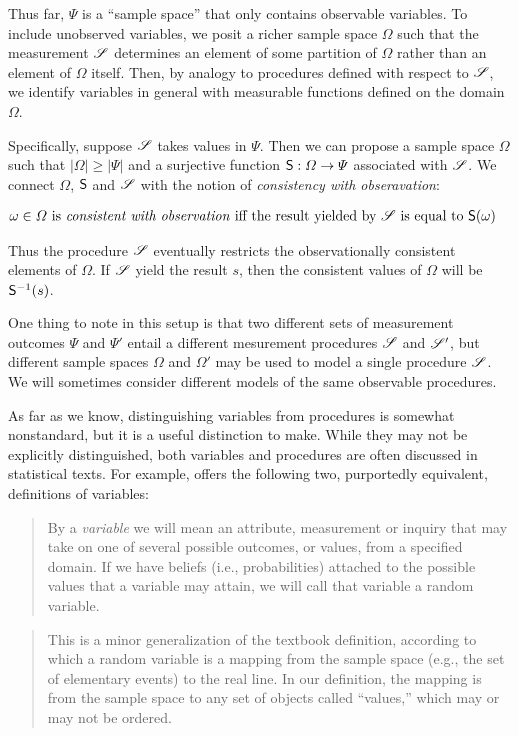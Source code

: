 Thus far, $\Psi$ is a ``sample space'' that only contains observable variables. To include unobserved variables, we posit a richer sample space $\Omega$ such that the measurement $\mathscr{S}$ determines an element of some partition of $\Omega$ rather than an element of $\Omega$ itself. Then, by analogy to procedures defined with respect to $\mathscr{S}$, we identify variables in general with measurable functions defined on the domain $\Omega$. 

Specifically, suppose $\mathscr{S}$ takes values in $\Psi$. Then we can propose a sample space $\Omega$ such that $|\Omega|\geq |\Psi|$ and a surjective function $\mathsf{S}:\Omega\to \Psi$ associated with $\mathscr{S}$. We connect $\Omega$, $\mathsf{S}$ and $\mathscr{S}$ with the notion of \emph{consistency with obseravation}:

\begin{align}
 &\omega\in \Omega\text{ is \emph{consistent with observation} iff the result yielded by }\mathscr{S}\text{ is equal to }\mathsf{S}(\omega)\label{def:observable}
\end{align}

Thus the procedure $\mathscr{S}$ eventually restricts the observationally consistent elements of $\Omega$. If $\mathscr{S}$ yield the result $s$, then the consistent values of $\Omega$ will be $\mathsf{S}^{-1}(s)$.

One thing to note in this setup is that two different sets of measurement outcomes $\Psi$ and $\Psi'$ entail a different mesurement procedures $\mathscr{S}$ and $\mathscr{S}'$, but different sample spaces $\Omega$ and $\Omega'$ may be used to model a single procedure $\mathscr{S}$. We will sometimes consider different models of the same observable procedures.

As far as we know, distinguishing variables from procedures is somewhat nonstandard, but it is a useful distinction to make. While they may not be explicitly distinguished, both variables and procedures are often discussed in statistical texts. For example, \citet{pearl_causality:_2009} offers the following two, purportedly equivalent, definitions of variables:
\begin{quote}
By a \emph{variable} we will mean an attribute, measurement or inquiry that may take on one of several possible outcomes, or values, from a specified domain. If we have beliefs (i.e., probabilities) attached to the possible values that a variable may attain, we will call that variable a random variable.
\end{quote}

\begin{quote}
This is a minor generalization of the textbook definition, according to which a random variable is a mapping from the sample space (e.g., the set of elementary events) to the real line. In our definition, the mapping is from the sample space to any set of objects called ``values,'' which may or may not be ordered.
\end{quote}

